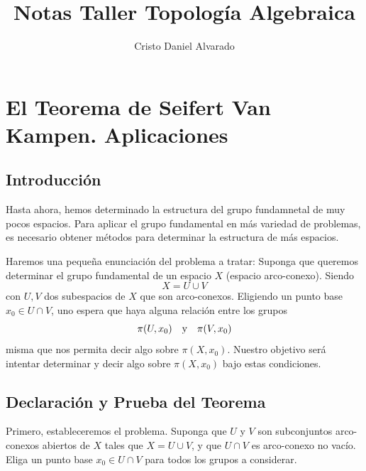 \documentclass[12pt]{report}
\newcounter{it}
\theoremstyle{largebreak}
\begin{document}
    \setlength{\parskip}{5pt} %
    \setlength{\parindent}{12pt} %
    \title{Notas Taller Topología Algebraica}
    \author{Cristo Daniel Alvarado}
    \maketitle

    \tableofcontents %

    
    \chapter{El Teorema de Seifert Van Kampen. Aplicaciones}
    
    \section{Introducción}
    
    Hasta ahora, hemos determinado la estructura del grupo fundamnetal de muy pocos espacios. Para aplicar el grupo fundamental en más variedad de problemas, es necesario obtener métodos para determinar la estructura de más espacios.

    Haremos una pequeña enunciación del problema a tratar: Suponga que queremos determinar el grupo fundamental de un espacio $X$ (espacio arco-conexo). Siendo
    \begin{equation*}
        X=U\cup V
    \end{equation*}
    con $U,V$ dos subespacios de $X$ que son arco-conexos. Eligiendo un punto base $x_0\in U\cap V$, uno espera que haya alguna relación entre los grupos
    \begin{equation*}
        \pi(U,x_0)\quad\textup{y}\quad\pi(V,x_0)
    \end{equation*}
    misma que nos permita decir algo sobre $\pi(X,x_0)$. Nuestro objetivo será intentar determinar y decir algo sobre $\pi(X,x_0)$ bajo estas condiciones.

    \section{Declaración y Prueba del Teorema}

    Primero, estableceremos el problema. Suponga que $U$ y $V$ son subconjuntos arco-conexos abiertos de $X$ tales que $X=U\cup V$, y que $U\cap V$ es arco-conexo no vacío. Eliga un punto base $x_0\in U\cap V$ para todos los grupos a considerar.
\end{document}
